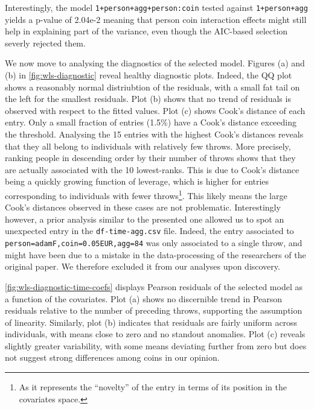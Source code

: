 \documentclass[a4paper, 12pt,oneside]{article}
\begin{document}
		Interestingly, the model \texttt{1+person+agg+person:coin} tested against \texttt{1+person+agg} yields a p-value of 2.04e-2 meaning that person coin interaction effects might still help in explaining part of the variance, even though the AIC-based selection severly rejected them. 

		We now move to analysing the diagnostics of the selected model. Figures (a) and (b) in \ref{fig:wls-diagnostic} reveal healthy diagnostic plots. Indeed, the QQ plot shows a reasonably normal distriubtion of the residuals, with a small fat tail on the left for the smallest residuals. Plot (b) shows that no trend of residuals is observed with respect to the fitted values. 
		Plot (c) shows Cook's distance of each entry. Only a small fraction of entries (1.5\%) have a Cook's distance exceeding the threshold. Analysing the 15 entries with the highest Cook's distances reveals that they all belong to individuals with relatively few throws. More precisely, ranking people in descending order by their number of throws shows that they are actually associated with the 10 lowest-ranks. This is due to Cook's distance being a quickly growing function of leverage, which is higher for entries corresponding to individuals with fewer throws\footnote{As it represents the ``novelty'' of the entry in terms of its position in the covariates space.}. This likely means the large Cook's distances observed in these cases are not problematic. Interestingly however, a prior analysis similar to the presented one allowed us to spot an unexpected entry in the \texttt{df-time-agg.csv} file. Indeed, the entry associated to \texttt{person=adamF,coin=0.05EUR,agg=84} was only associated to a single throw, and might have been due to a mistake in the data-processing of the researchers of the original paper. We therefore excluded it from our analyses upon discovery. 

		\ref{fig:wls-diagnostic-time-coefs} displays Pearson residuals of the selected model as a function of the covariates.
		Plot (a) shows no discernible trend in Pearson residuals relative to the number of preceding throws, supporting the assumption of linearity.
		Similarly, plot (b) indicates that residuals are fairly uniform across individuals, with means close to zero and no standout anomalies. Plot (c) reveals slightly greater variability, with some means deviating further from zero but does not suggest strong differences among coins in our opinion.
\end{document}
